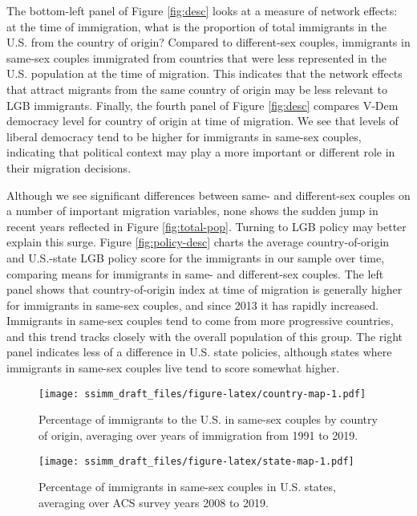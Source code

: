 \documentclass[
  12pt,
]{article}
\begin{document}
The bottom-left panel of Figure \ref{fig:desc} looks at a measure of network effects: at the time of immigration, what is the proportion of total immigrants in the U.S. from the country of origin? Compared to different-sex couples, immigrants in same-sex couples immigrated from countries that were less represented in the U.S. population at the time of migration. This indicates that the network effects that attract migrants from the same country of origin may be less relevant to LGB immigrants. Finally, the fourth panel of Figure \ref{fig:desc} compares V-Dem democracy level for country of origin at time of migration. We see that levels of liberal democracy tend to be higher for immigrants in same-sex couples, indicating that political context may play a more important or different role in their migration decisions.

Although we see significant differences between same- and different-sex couples on a number of important migration variables, none shows the sudden jump in recent years reflected in Figure \ref{fig:total-pop}. Turning to LGB policy may better explain this surge. Figure \ref{fig:policy-desc} charts the average country-of-origin and U.S.-state LGB policy score for the immigrants in our sample over time, comparing means for immigrants in same- and different-sex couples. The left panel shows that country-of-origin index at time of migration is generally higher for immigrants in same-sex couples, and since 2013 it has rapidly increased. Immigrants in same-sex couples tend to come from more progressive countries, and this trend tracks closely with the overall population of this group. The right panel indicates less of a difference in U.S. state policies, although states where immigrants in same-sex couples live tend to score somewhat higher.

\begin{figure}
\centering
\texttt{[image: ssimm\_draft\_files/figure-latex/country-map-1.pdf]}
\caption{\label{fig:country-map}Percentage of immigrants to the U.S. in same-sex couples by country of origin, averaging over years of immigration from 1991 to 2019.}
\end{figure}

\begin{figure}
\centering
\texttt{[image: ssimm\_draft\_files/figure-latex/state-map-1.pdf]}
\caption{\label{fig:state-map}Percentage of immigrants in same-sex couples in U.S. states, averaging over ACS survey years 2008 to 2019.}
\end{figure}
\end{document}

